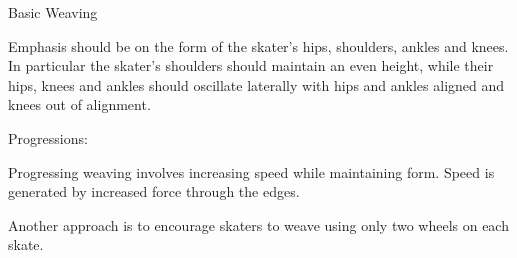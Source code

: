 Basic Weaving




Emphasis should be on the form of the skater's hips, shoulders, ankles and knees.   
In particular the skater's shoulders should maintain an even height, while their hips, knees and ankles should oscillate laterally with hips and ankles aligned and knees out of alignment.    


Progressions:

Progressing weaving involves increasing speed while maintaining form.   
Speed is generated by increased force through the edges.  

Another approach is to encourage skaters to weave using only two wheels on each skate.  
